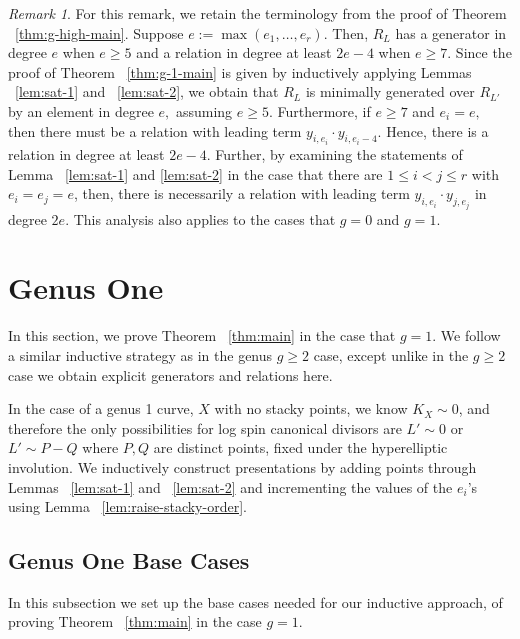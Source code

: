 \documentclass{amsart}
\theoremstyle{plain}
\theoremstyle{definition}
\theoremstyle{remark}
\newtheorem{rem}[thm]{Remark}
\numberwithin{equation}{section}
\newcommand\ssec{\subsection}
\newcommand{\halfcan}{L}
\begin{document}
\begin{rem}
\label{rem:genus-2-explicit-bound}
For this remark, we retain the terminology from the proof of Theorem ~\ref{thm:g-high-main}.
Suppose $e :=  \max(e_1,\ldots, e_r).$ Then, $R_L$ has a generator in degree $e$ when $e \geq 5$ and a relation in degree at least $2e-4$ when $e \geq 7$. Since the proof of Theorem ~\ref{thm:g-1-main} is given by inductively 
applying Lemmas ~\ref{lem:sat-1} and ~\ref{lem:sat-2}, we obtain that $R_L$ is minimally generated over $R_{L'}$ by an element in degree $e,$ assuming $e \geq 5$. Furthermore, if $e \geq 7$ and $e_i = e,$ 
then there must be a relation with leading term $y_{i,e_i} \cdot y_{i,e_i-4}.$ Hence, there is a relation in degree at least $2e - 4$. 
Further, by examining the statements of Lemma ~\ref{lem:sat-1} and \ref{lem:sat-2} in the case that there are $1 \leq i < j \leq r$ with $e_i = e_j = e$, then, there is necessarily a relation with leading term $y_{i, e_i} \cdot y_{j, e_j}$ in degree $2e$. This analysis also applies to the cases that $g = 0$ and $g = 1$.
\end{rem}




\section{Genus One}
\label{sec:g-1}

In this section, we prove Theorem ~\ref{thm:main} in the case that $g = 1$.  We follow a similar inductive strategy as in the genus $g\geq 2$ case, except unlike in the $g \geq 2$ case we obtain explicit generators and relations here.

In the case of a genus 1 curve, $X$ with no stacky points, we know $K_X \sim 0$, and therefore the only possibilities for log spin canonical divisors are $\halfcan' \sim 0$ or $\halfcan' \sim P - Q$ where $P, Q$ are distinct points, fixed  under the hyperelliptic involution. We inductively construct presentations by adding points through Lemmas ~\ref{lem:sat-1} and ~\ref{lem:sat-2} and incrementing the values of the $e_i$'s using Lemma ~\ref{lem:raise-stacky-order}.

\ssec{Genus One Base Cases}
\label{ssec:g-1_base}
In this subsection we set up the base cases needed for our inductive approach, of proving Theorem ~\ref{thm:main} in the case $g = 1$.
\end{document}

